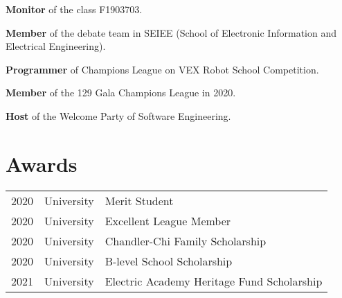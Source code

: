 \documentclass[]{deedy-resume-openfont}
\begin{document}
\begin{minipage}[t]{0.66\textwidth}
\begin{tightemize}
\item \textbf{Monitor} of the class F1903703.
\item \textbf{Member} of the debate team in SEIEE (School of Electronic Information and Electrical Engineering).
\item \textbf{Programmer} of Champions League on VEX Robot School Competition.
\item \textbf{Member} of the 129 Gala Champions League in 2020.
\item \textbf{Host} of the Welcome Party of Software Engineering.
\end{tightemize}
\sectionsep


\section{Awards} 
\begin{tabular}{rll}
2020         & University  & Merit Student\\
2020         & University  & Excellent League Member\\
2020	     & University  & Chandler-Chi Family Scholarship\\
2020	     & University  & B-level School Scholarship\\
2021	     & University  & Electric Academy Heritage Fund Scholarship\\
\end{tabular}
\sectionsep

\end{minipage} 
\end{document}

